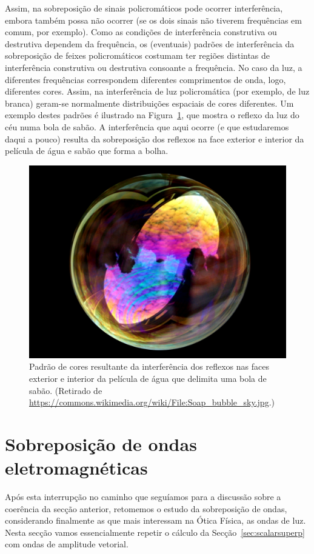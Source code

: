 Assim, na sobreposição de sinais policromáticos pode ocorrer interferência,
embora também possa não ocorrer (se os dois sinais não tiverem frequências em
comum, por exemplo). Como as condições de interferência construtiva ou
destrutiva dependem da frequência, os (eventuais) padrões de interferência da
sobreposição de feixes policromáticos costumam ter regiões distintas de
interferência construtiva ou destrutiva consoante a frequência. No caso da luz,
a diferentes frequências correspondem diferentes comprimentos de onda, logo,
diferentes cores. Assim, na interferência de luz policromática (por exemplo, de
luz branca) geram-se normalmente distribuições espaciais de cores diferentes.
Um exemplo destes padrões é ilustrado na Figura~\ref{fig:soapbubble}, que mostra
o reflexo da luz do céu numa bola de sabão.  A interferência que aqui ocorre (e
que estudaremos daqui a pouco) resulta da sobreposição dos reflexos na face
exterior e interior da película de água e sabão que forma a bolha.
\begin{figure}[htb]
{\centering
\includegraphics[width=0.3\linewidth]{figs/soap_bubble.jpg}\par
}
\caption{Padrão de cores resultante da interferência dos reflexos nas faces
exterior e interior da película de água que delimita uma bola de
sabão. (Retirado de
\protect\url{https://commons.wikimedia.org/wiki/File:Soap_bubble_sky.jpg}.)
\label{fig:soapbubble}}
\end{figure}


\section{Sobreposição de ondas eletromagnéticas}
Após esta interrupção no caminho que seguíamos para a discussão sobre a
coerência da secção anterior, retomemos o estudo da sobreposição de ondas,
considerando finalmente as que mais interessam na Ótica Física, as ondas de luz.
Nesta secção vamos essencialmente repetir o cálculo da
Secção~\ref{sec:scalarsuperp} com ondas de amplitude vetorial.

